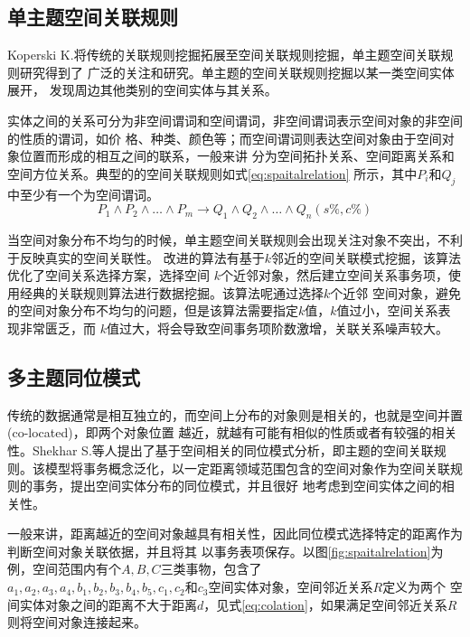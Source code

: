 \subsection{单主题空间关联规则}
Koperski K.将传统的关联规则挖掘拓展至空间关联规则挖掘，单主题空间关联规则研究得到了
广泛的关注和研究。单主题的空间关联规则挖掘以某一类空间实体展开\cite{Ester1999Spatial}，
发现周边其他类别的空间实体与其关系。

实体之间的关系可分为非空间谓词和空间谓词，非空间谓词表示空间对象的非空间的性质的谓词，如价
格、种类、颜色等；而空间谓词则表达空间对象由于空间对象位置而形成的相互之间的联系，一般来讲
分为空间拓扑关系、空间距离关系和空间方位关系。典型的的空间关联规则如式\eqref{eq:spaitalrelation}
所示，其中$P_i$和$Q_j$中至少有一个为空间谓词。
\begin{equation}
\label{eq:spaitalrelation}
P_1\wedge P_2\wedge \ldots \wedge P_m \rightarrow Q_1\wedge Q_2\wedge \ldots \wedge Q_n(s\%, c\%)
\end{equation}

当空间对象分布不均匀的时候，单主题空间关联规则会出现关注对象不突出，不利于反映真实的空间关联性。
改进的算法有基于$k$邻近的空间关联模式挖掘\cite{万幼2008k}，该算法优化了空间关系选择方案，选择空间
$k$个近邻对象，然后建立空间关系事务项，使用经典的关联规则算法进行数据挖掘。该算法呢通过选择$k$个近邻
空间对象，避免的空间对象分布不均匀的问题，但是该算法需要指定$k$值，$k$值过小，空间关系表现非常匮乏，而
$k$值过大，将会导致空间事务项阶数激增，关联关系噪声较大\cite{Bian2009A}。

\subsection{多主题同位模式}

传统的数据通常是相互独立的，而空间上分布的对象则是相关的，也就是空间并置(co-located)，即两个对象位置
越近，就越有可能有相似的性质或者有较强的相关性。Shekhar S.等人提出了基于空间相关的同位模式分析\cite{Jin2006A}，即主题的空间关联规
则。该模型将事务概念泛化，以一定距离领域范围包含的空间对象作为空间关联规则的事务，提出空间实体分布的同位模式，并且很好
地考虑到空间实体之间的相关性\cite{Huang2004Discovering}。

一般来讲，距离越近的空间对象越具有相关性，因此同位模式选择特定的距离作为判断空间对象关联依据，并且将其
以事务表项保存。以图\ref{fig:spaitalrelation}为例，空间范围内有个$A,B,C$三类事物，包含了
$a_1,a_2,a_3,a_4,b_1,b_2,b_3,b_4,b_5,c_1,c_2\text{和}c_3$空间实体对象，空间邻近关系$R$定义为两个
空间实体对象之间的距离不大于距离$d$，见式\eqref{eq:colation}，如果满足空间邻近关系$R$则将空间对象连接起来。

